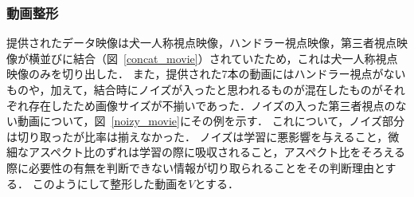 \subsubsection{動画整形}
提供されたデータ映像は犬一人称視点映像，ハンドラー視点映像，第三者視点映像が横並びに結合（図~\ref{concat_movie}）されていたため，これは犬一人称視点映像のみを切り出した．
また，提供された7本の動画にはハンドラー視点がないものや，加えて，結合時にノイズが入ったと思われるものが混在したものがそれぞれ存在したため画像サイズが不揃いであった．ノイズの入った第三者視点のない動画について，図~\ref{noizy_movie}にその例を示す．
これについて，ノイズ部分は切り取ったが比率は揃えなかった．
ノイズは学習に悪影響を与えること，微細なアスペクト比のずれは学習の際に吸収されること，アスペクト比をそろえる際に必要性の有無を判断できない情報が切り取られることをその判断理由とする．
このようにして整形した動画を$V$とする．
